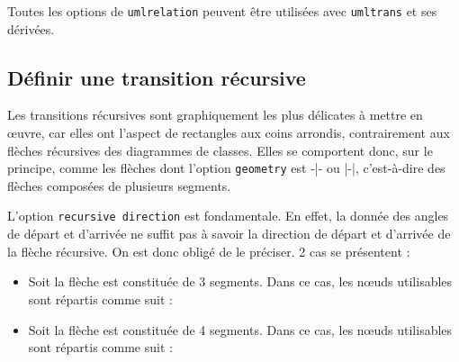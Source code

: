 \documentclass[a4paper,11pt]{report}
\newcommand{\inputTikZ}[1]{%
  }%
\newcommand{\inputTikZ}[1]{%
    \texttt{[image: fig/\#1.pdf]}%
  }%
\begin{document}
\medskip

Toutes les options de {\tt umlrelation} peuvent être utilisées avec {\tt umltrans} et ses dérivées.

\subsection{Définir une transition récursive}\label{s.rectrans}

Les transitions récursives sont graphiquement les plus délicates à mettre en \oe{}uvre, car elles ont l'aspect de rectangles aux coins arrondis, contrairement aux flèches récursives des diagrammes de classes. Elles se comportent donc, sur le principe, comme les flèches dont l'option {\tt geometry} est -|- ou |-|, c'est-à-dire des flèches composées de plusieurs segments.

\medskip

\begin{minipage}{0.51\textwidth}

\end{minipage}
\begin{minipage}{0.49\textwidth}
\begin{center}
\inputTikZ{transitionrec}
\end{center}
\end{minipage}

\medskip

L'option {\tt recursive direction} est fondamentale. En effet, la donnée des angles de départ et d'arrivée ne suffit pas à savoir la direction de départ et d'arrivée de la flèche récursive. On est donc obligé de le préciser. 2 cas se présentent :

\medskip

\begin{itemize}
\item Soit la flèche est constituée de 3 segments. Dans ce cas, les n\oe{}uds utilisables sont répartis comme suit :

\begin{center}
\inputTikZ{transitionrec-rtr-ptname}
\end{center}

\item Soit la flèche est constituée de 4 segments. Dans ce cas, les n\oe{}uds utilisables sont répartis comme suit :

\medskip

\begin{center}
\inputTikZ{transitionrec-rtb-ptname}
\end{center}

\vspace{-4cm}

\end{itemize}
\end{document}
